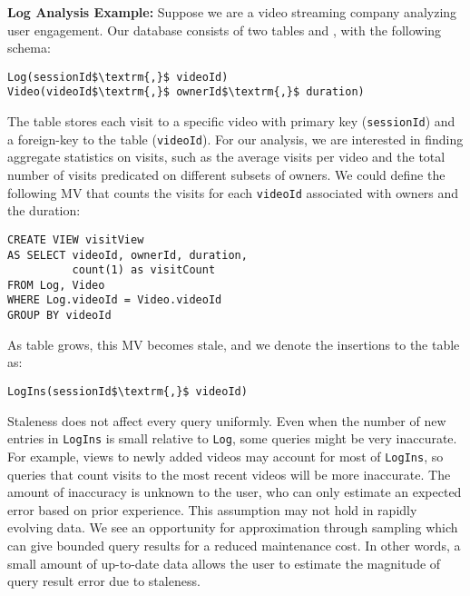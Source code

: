 \noindent \textbf{Log Analysis Example: } 
Suppose we are a video streaming company analyzing user engagement.
Our database consists of two tables  and , with the following schema:
\begin{lstlisting}[mathescape,basicstyle={\scriptsize}]
Log(sessionId$\textrm{,}$ videoId)
Video(videoId$\textrm{,}$ ownerId$\textrm{,}$ duration)
\end{lstlisting}
The  table stores each visit to a specific video with primary key (\texttt{sessionId}) and a foreign-key to the  table (\texttt{videoId}).
For our analysis, we are interested in finding aggregate statistics on visits, such as the average visits per video and the total number of visits predicated on different subsets of owners. 
We could define the following MV that counts the visits for each \texttt{videoId} associated with owners and the duration: 
\begin{lstlisting}[mathescape,basicstyle={\scriptsize}]
CREATE VIEW visitView
AS SELECT videoId, ownerId, duration,
          count(1) as visitCount
FROM Log, Video
WHERE Log.videoId = Video.videoId
GROUP BY videoId
\end{lstlisting}
As  table grows, this MV becomes stale, and we denote the insertions to the table as:
\begin{lstlisting}[mathescape,basicstyle={\scriptsize}]
LogIns(sessionId$\textrm{,}$ videoId)
\end{lstlisting}

Staleness does not affect every query uniformly.
Even when the number of new entries in \texttt{LogIns} is small relative to \texttt{Log}, some queries might be very inaccurate.
For example, views to newly added videos may account for most of \texttt{LogIns}, so queries that count visits to the most recent videos will be more inaccurate.
The amount of inaccuracy is unknown to the user, who can only estimate an expected error based on prior experience.
This assumption may not hold in rapidly evolving data.
We see an opportunity for approximation through sampling which can give bounded query results for a reduced maintenance cost.
In other words, a small amount of up-to-date data allows the user to estimate the magnitude of query result error due to staleness.


